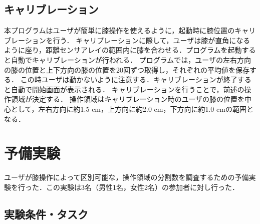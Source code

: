 \documentclass[submit, techrep]{ipsj}
\begin{document}
\subsection{キャリブレーション}
本プログラムはユーザが簡単に膝操作を使えるように，起動時に膝位置のキャリブレーションを行う．
キャリブレーションに際して，ユーザは膝が直角になるように座り，距離センサアレイの範囲内に膝を合わせる．プログラムを起動すると自動でキャリブレーションが行われる．
プログラムでは，ユーザの左右方向の膝の位置と上下方向の膝の位置を20回ずつ取得し，それぞれの平均値を保存する．
この時ユーザは動かないように注意する．キャリブレーションが終了すると自動で開始画面が表示される．
キャリブレーションを行うことで，前述の操作領域が決定する．
操作領域はキャリブレーション時のユーザの膝の位置を中心として，左右方向に約1.5 \si{cm}，上方向に約2.0 \si{cm}，下方向に約1.0 \si{cm}の範囲となる．

\section{予備実験}
ユーザが膝操作によって区別可能な，操作領域の分割数を調査するための予備実験を行った．この実験は3名（男性1名，女性2名）の参加者に対し行った．

\subsection{実験条件・タスク}
\end{document}
